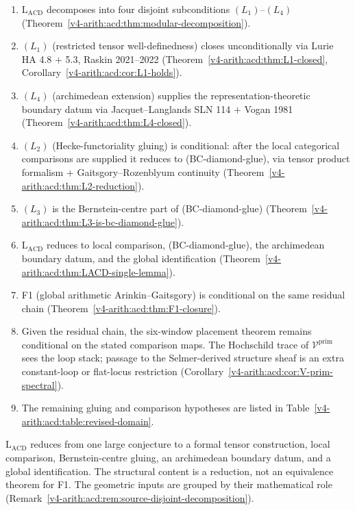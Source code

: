\begin{enumerate}
\item \(\mathrm{L}_{\mathrm{ACD}}\) decomposes into four disjoint
subconditions \((L_{1})\)--\((L_{4})\)
(Theorem~\ref{v4-arith:acd:thm:modular-decomposition}).
\item \((L_{1})\) (restricted tensor well-definedness) closes
unconditionally via Lurie HA 4.8 \(+\) 5.3, Raskin 2021--2022
(Theorem~\ref{v4-arith:acd:thm:L1-closed},
Corollary~\ref{v4-arith:acd:cor:L1-holds}).
\item \((L_{4})\) (archimedean extension) supplies the
representation-theoretic boundary datum via Jacquet--Langlands SLN 114
\(+\) Vogan 1981
(Theorem~\ref{v4-arith:acd:thm:L4-closed}).
\item \((L_{2})\) (Hecke-functoriality gluing) is conditional:
after the local categorical comparisons are supplied it reduces
to (BC-diamond-glue), via tensor product formalism \(+\)
Gaitsgory--Rozenblyum continuity
(Theorem~\ref{v4-arith:acd:thm:L2-reduction}).
\item \((L_{3})\) is the Bernstein-centre part of (BC-diamond-glue)
(Theorem~\ref{v4-arith:acd:thm:L3-is-bc-diamond-glue}).
\item \(\mathrm{L}_{\mathrm{ACD}}\) reduces to local comparison,
(BC-diamond-glue), the archimedean boundary datum, and the global
identification
(Theorem~\ref{v4-arith:acd:thm:LACD-single-lemma}).
\item F1 (global arithmetic Arinkin--Gaitsgory) is conditional on the
same residual chain
(Theorem~\ref{v4-arith:acd:thm:F1-closure}).
\item Given the residual chain, the six-window placement theorem
remains conditional on the stated comparison maps. The Hochschild trace of
\(\mathcal{V}^{\mathrm{prim}}\) sees the loop stack; passage to the
Selmer-derived structure sheaf is an extra constant-loop or flat-locus
restriction
(Corollary~\ref{v4-arith:acd:cor:V-prim-spectral}).
\item The remaining gluing and comparison hypotheses are listed in
Table~\ref{v4-arith:acd:table:revised-domain}.
\end{enumerate}

\(\mathrm{L}_{\mathrm{ACD}}\) reduces from one large conjecture to a
formal tensor construction, local comparison, Bernstein-centre gluing,
an archimedean boundary datum, and a global identification.  The
structural content is a reduction, not an equivalence theorem for F1.
The geometric inputs are grouped by their mathematical role
(Remark~\ref{v4-arith:acd:rem:source-disjoint-decomposition}).

